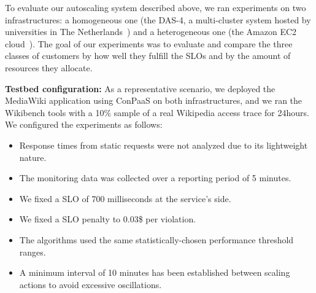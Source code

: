 To evaluate our autoscaling system described above, we ran experiments
on two infrastructures: a homogeneous one (the DAS-4, a multi-cluster system
hosted by universities in The Netherlands~\cite{das4}) and a heterogeneous
one (the Amazon EC2 cloud~\cite{amazonEC2}). The goal of our experiments
was to evaluate and compare the three classes of customers by how well they fulfill 
the SLOs and by the amount of resources they allocate.



\textbf{Testbed configuration:}  As a representative scenario, we deployed the MediaWiki application using ConPaaS on both infrastructures, and we ran the Wikibench tools with a 10\% sample of a real Wikipedia access trace for 24hours. 
We configured the experiments as follows:

\begin{itemize}
\item  Response times from static requests were not analyzed due to its lightweight nature. 

\item The monitoring data was collected over a reporting period of 5 minutes.

\item We fixed a SLO of 700 milliseconds at the service's side.

\item We fixed a SLO penalty to 0.03\$ per violation.

\item The algorithms used the same statistically-chosen performance threshold ranges. 

\item A minimum interval of 10 minutes has been established between scaling actions to avoid excessive oscillations. 
\end{itemize}


